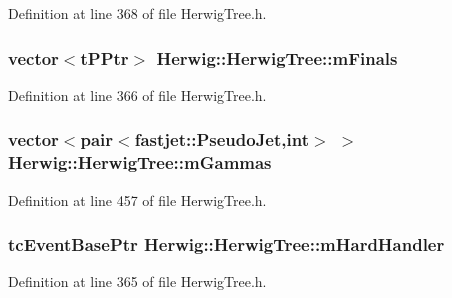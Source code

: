 Definition at line 368 of file Herwig\+Tree.\+h.

\subsubsection[{\texorpdfstring{m\+Finals}{mFinals}}]{\setlength{\rightskip}{0pt plus 5cm}vector$<$t\+P\+Ptr$>$ Herwig\+::\+Herwig\+Tree\+::m\+Finals\hspace{0.3cm}{\ttfamily [protected]}}\hypertarget{class_herwig_1_1_herwig_tree_abd8e1116b0df9d4214f77ce86438d4d4}{}\label{class_herwig_1_1_herwig_tree_abd8e1116b0df9d4214f77ce86438d4d4}


Definition at line 366 of file Herwig\+Tree.\+h.

\subsubsection[{\texorpdfstring{m\+Gammas}{mGammas}}]{\setlength{\rightskip}{0pt plus 5cm}vector$<$pair$<$fastjet\+::\+Pseudo\+Jet,int$>$ $>$ Herwig\+::\+Herwig\+Tree\+::m\+Gammas\hspace{0.3cm}{\ttfamily [protected]}}\hypertarget{class_herwig_1_1_herwig_tree_a5cb588d629626d524e56d88b93082d3a}{}\label{class_herwig_1_1_herwig_tree_a5cb588d629626d524e56d88b93082d3a}


Definition at line 457 of file Herwig\+Tree.\+h.

\subsubsection[{\texorpdfstring{m\+Hard\+Handler}{mHardHandler}}]{\setlength{\rightskip}{0pt plus 5cm}tc\+Event\+Base\+Ptr Herwig\+::\+Herwig\+Tree\+::m\+Hard\+Handler\hspace{0.3cm}{\ttfamily [protected]}}\hypertarget{class_herwig_1_1_herwig_tree_a96e103a607ddc543e5ad1c4c097da79f}{}\label{class_herwig_1_1_herwig_tree_a96e103a607ddc543e5ad1c4c097da79f}


Definition at line 365 of file Herwig\+Tree.\+h.

